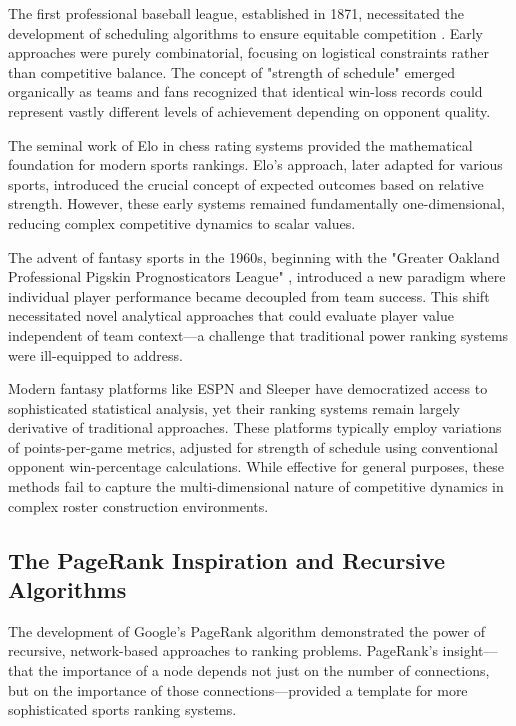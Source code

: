 \documentclass[11pt]{article}
\begin{document}
The first professional baseball league, established in 1871, necessitated the development of scheduling algorithms to ensure equitable competition \cite{seymour1960baseball}. Early approaches were purely combinatorial, focusing on logistical constraints rather than competitive balance. The concept of "strength of schedule" emerged organically as teams and fans recognized that identical win-loss records could represent vastly different levels of achievement depending on opponent quality.

The seminal work of Elo \cite{elo1978rating} in chess rating systems provided the mathematical foundation for modern sports rankings. Elo's approach, later adapted for various sports, introduced the crucial concept of expected outcomes based on relative strength. However, these early systems remained fundamentally one-dimensional, reducing complex competitive dynamics to scalar values.

The advent of fantasy sports in the 1960s, beginning with the "Greater Oakland Professional Pigskin Prognosticators League" \cite{walker2006fantasyland}, introduced a new paradigm where individual player performance became decoupled from team success. This shift necessitated novel analytical approaches that could evaluate player value independent of team context—a challenge that traditional power ranking systems were ill-equipped to address.

Modern fantasy platforms like ESPN and Sleeper have democratized access to sophisticated statistical analysis, yet their ranking systems remain largely derivative of traditional approaches. These platforms typically employ variations of points-per-game metrics, adjusted for strength of schedule using conventional opponent win-percentage calculations. While effective for general purposes, these methods fail to capture the multi-dimensional nature of competitive dynamics in complex roster construction environments.

\subsection{The PageRank Inspiration and Recursive Algorithms}

The development of Google's PageRank algorithm \cite{page1999pagerank} demonstrated the power of recursive, network-based approaches to ranking problems. PageRank's insight—that the importance of a node depends not just on the number of connections, but on the importance of those connections—provided a template for more sophisticated sports ranking systems.
\end{document}
